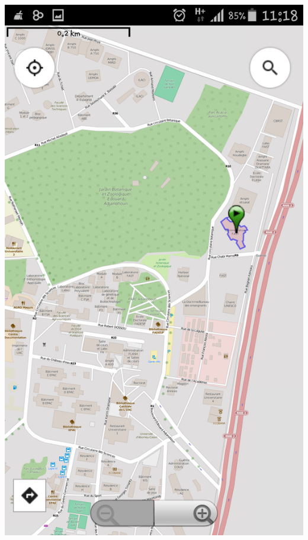 \documentclass[11pt,handout]{beamer}
\begin{document}
\begin{frame}
			   \includegraphics[scale=0.0985]{images/cherche_result.png}
		      \end{frame}
		      
\end{document}
